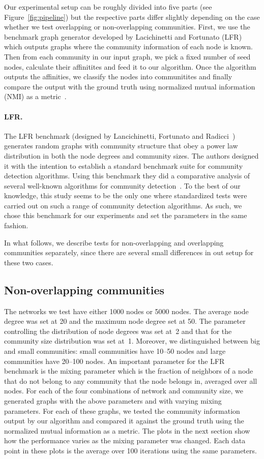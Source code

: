 Our experimental setup can be roughly divided into five parts (see Figure~\ref{fig:pipeline}) but the 
respective parts differ slightly depending on the case whether we test overlapping or non-overlapping 
communities. First, we use the benchmark graph generator developed by Lacichinetti and Fortunato 
(LFR)~\cite{LFR08, LF09} which outputs graphs where the community information of each node 
is known. Then from each community in our input graph, we pick a fixed number of seed nodes, 
calculate their affinitites and feed it to our algorithm. Once the algorithm outputs the 
affinities, we classify the nodes into communitites and finally compare the output 
with the ground truth using normalized mutual information (NMI) as a metric~\cite{DDDA05}.


\paragraph{LFR.}
The LFR benchmark (designed by Lancichinetti, Fortunato and Radicci~\cite{LFR08}) 
generates random graphs with community structure that obey a power law 
distribution in both the node degrees and community sizes. The authors designed it 
with the intention to establish a standard benchmark suite for community detection 
algorithms. Using this benchmark they did a comparative analysis of several well-known algorithms
for community detection~\cite{LF09}. To the best of our knowledge, this study seems to be the 
only one where standardized tests were carried out on such a range of community detection algorithms. 
As such, we chose this benchmark for our experiments and set the parameters in the same fashion. 

In what follows, we describe tests for non-overlapping and overlapping communities separately, since 
there are several small differences in out setup for these two cases. 

\subsection{Non-overlapping communities}
The networks we test have either 1000 nodes or 5000 nodes. The average node degree
was set at 20 and the maximum node degree set at 50. The parameter controlling the 
distribution of node degrees was set at~2 and that for the community size distribution was 
set at~1. Moreover, we distinguished between big and small communities: small communities have 
10--50 nodes and large communities have 20--100 nodes. An important parameter 
for the LFR benchmark is the mixing parameter which is the fraction of neighbors 
of a node that do not belong to any community that the node belongs in, averaged over all nodes.
For each of the four combinations of network and community size, we generated graphs with the 
above parameters and with varying mixing parameters. For each of these graphs, we tested the 
community information output by our algorithm and compared it against the ground truth 
using the normalized mutual information as a metric. The plots in the next section 
show how the performance varies as the mixing parameter was changed. Each data point in 
these plots is the average over 100 iterations using the same parameters. 

